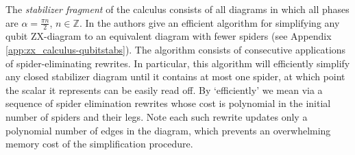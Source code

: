 The \emph{stabilizer fragment} of the calculus consists of all diagrams in which all phases are $\alpha=\frac{\pi n}{2}$, $n\in\mathbb{Z}$.
In \cite[Theorem 5.4]{graph_theoretic_simplification} the authors give an efficient algorithm for simplifying any qubit ZX-diagram to an equivalent diagram with fewer spiders (see Appendix \ref{app:zx_calculus-qubitstabs}).
The algorithm consists of consecutive applications of
spider-eliminating rewrites.
In particular,
this algorithm will efficiently simplify any closed stabilizer diagram until it contains at most one spider, at which point the scalar it represents can be easily read off. 
By `efficiently' we mean via a sequence of spider elimination rewrites whose cost is polynomial in the initial number of spiders and their legs. Note each such rewrite updates only a polynomial number of edges in the diagram, which prevents an overwhelming memory cost of the simplification procedure.